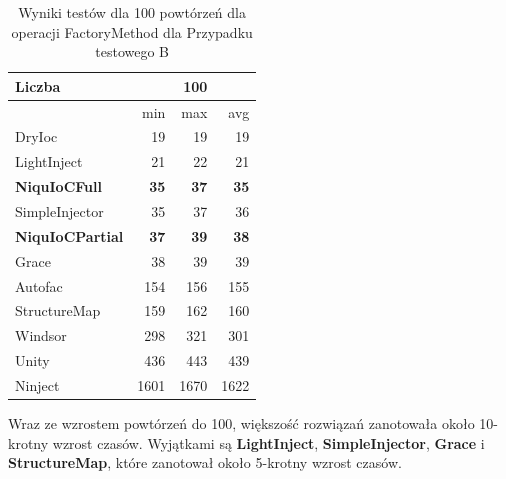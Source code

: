 \documentclass[12pt]{article}
\begin{document}
\begin{table}[H]
\captionsetup{belowskip=0pt,aboveskip=0pt}
\begin{center}
\begin{small}
	\begin{tabular}{ | l | r r r | }
    		\hline
Liczba & & 100 & \\ \hline
 & min & max & avg \\ \hline
DryIoc & 19 & 19 & 19 \\ \hline
LightInject & 21 & 22 & 21 \\ \hline
\textbf{NiquIoCFull} & \textbf{35} & \textbf{37} & \textbf{35} \\ \hline
SimpleInjector & 35 & 37 & 36 \\ \hline
\textbf{NiquIoCPartial} & \textbf{37} & \textbf{39} & \textbf{38} \\ \hline
Grace & 38 & 39 & 39 \\ \hline
Autofac & 154 & 156 & 155 \\ \hline
StructureMap & 159 & 162 & 160 \\ \hline
Windsor & 298 & 321 & 301 \\ \hline
Unity & 436 & 443 & 439 \\ \hline
Ninject & 1601 & 1670 & 1622 \\ \hline
  	\end{tabular}
\end{small}
\end{center}
\caption{Wyniki testów dla 100 powtórzeń dla operacji FactoryMethod dla Przypadku testowego B}
\label{TestCaseB_FactoryMethod100}
\end{table}
Wraz ze wzrostem powtórzeń do 100, większość rozwiązań zanotowała około 10-krotny wzrost czasów. Wyjątkami są \textbf{LightInject}, \textbf{SimpleInjector}, \textbf{Grace} i \textbf{StructureMap}, które zanotował około 5-krotny wzrost czasów.
\\ \\
\end{document}
